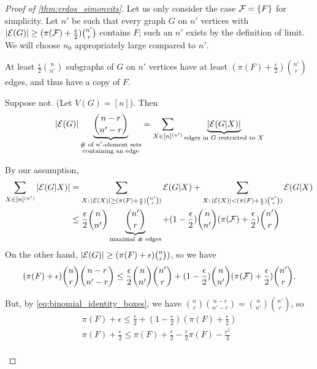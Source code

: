 \begin{proof}[Proof of \cref{thm:erdos_simonvits}]
Let us only consider the case $\mathcal{F}=\{F\}$ for simplicity. Let $n'$ be such that every graph $G$ on $n'$ vertices with $|\mathcal{E}(G)|\geq (\pi (\mathcal{F}) + \frac{\epsilon}{2}) {n' \choose r}$ contains $F$; such an $n'$ exists by the definition of limit. We will choose $n_0$ appropriately large compared to $n'$.
\begin{claim}
At least $\frac{\epsilon}{2}{n\choose n'}$ subgraphs of $G$ on $n'$ vertices have at least $(\pi(F) + \frac{\epsilon}{2} ) {n' \choose r}$ edges, and thus have a copy of $F$.
\end{claim}
\begin{subproof}
Suppose not. (Let $V(G)=[n]$). Then
\begin{gather*}
|\mathcal{E}(G)| \underbrace{{n-r \choose n'-r}}_{\substack{\text{\# of $n'$-element sets}\\\text{containing an edge}}} = \sum_{X\in [n]^{(n')}} \underbrace{| \mathcal{E} (G|X)|}_{\text{edges in $G$ restricted to $X$}}
\end{gather*}
\begin{fullwidth}
By our assumption,
\begin{align*}
\sum_{X\in [n]^{(n')}} | \mathcal{E} (G|X)| &= \sum_{X:\, |\mathcal{E} (X)| \geq ( \pi(F) + \frac{\epsilon}{2}) {n' \choose r}) }\mathcal{E} (G|X) + \sum_{X:\, |\mathcal{E} (X)| < ( \pi(F) + \frac{\epsilon}{2}) {n' \choose r}) }\mathcal{E} (G|X) \\
&\leq\frac{\epsilon}{2} {n \choose n'}\underbrace{{n' \choose r}}_{\text{maximal \# edges}} + (1 - \frac{\epsilon}{2}){n \choose n'} (\pi(\mathcal{F}) + \frac{\epsilon}{2}){n' \choose r}
\end{align*}
On the other hand, $|\mathcal{E} (G)| \geq ( \pi(F) + \epsilon) {n \choose r})$, so we have
\[
( \pi(F) +\epsilon) {n \choose r}{n-r \choose n'-r}\leq \frac{\epsilon}{2} {n \choose n'}{n' \choose r} + (1 - \frac{\epsilon}{2}){n \choose n'} (\pi(\mathcal{F}) + \frac{\epsilon}{2}){n' \choose r}.
\]
\end{fullwidth}
But, by \cref{eq:binomial_identity_boxes}, we have ${n \choose r}{n-r \choose n'-r}  ={n \choose n'}{n' \choose r} $, so
\begin{gather*}	
\pi(F) + \epsilon \leq \frac{\epsilon}{2} + (1- \frac{\epsilon}{2}) (\pi(F) + \frac{\epsilon}{2})\\
\pi(F)+\frac{\epsilon}{2} \leq \pi(F) + \frac{\epsilon}{2} - \frac{\epsilon}{2}\pi(F) - \frac{\epsilon^2}{4}\\

\end{gather*}
\end{subproof}
\end{proof}
